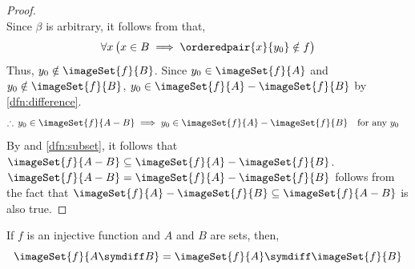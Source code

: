 \begin{proof}
\begin{equation*}
    \end{equation*}
    Since \( \beta \) is arbitrary, it follows from  that,
    \begin{equation*}
        \forall x \, \big( x \in B \implies \orderedpair{x}{y_{0}} \notin f \big)
    \end{equation*}
    Thus, \( y_{0} \notin \imageSet{f}{B} \). Since \( y_{0} \in \imageSet{f}{A} \) and \( y_{0} \notin \imageSet{f}{B} \),
    \( y_{0} \in \imageSet{f}{A} - \imageSet{f}{B} \) by \cref{dfn:difference}.
    \begin{equation*}
        \begin{aligned}
            \therefore \, y_{0} \in \imageSet{f}{A-B} \implies y_{0} \in \imageSet{f}{A} - \imageSet{f}{B}&
        \end{aligned}
        \begin{aligned}
            &\text{for any \( y_{0} \)}
        \end{aligned}
    \end{equation*}
    By  and \cref{dfn:subset}, it follows that \( \imageSet{f}{A-B} \subseteq \imageSet{f}{A} - \imageSet{f}{B} \).
    \( \imageSet{f}{A-B} = \imageSet{f}{A} - \imageSet{f}{B} \) follows from the fact that \( \imageSet{f}{A} - \imageSet{f}{B} \subseteq \imageSet{f}{A-B} \)
    is also true.
\end{proof}

\begin{thm}
    \label{thm:for-injective-functions-the-image-of-the-symdiff-is-the-symdiff-of-the-images}
    If \( f \) is an injective function and \( A \) and \( B \) are sets, then,
    \begin{equation*}
        \imageSet{f}{A \symdiff B} = \imageSet{f}{A} \symdiff \imageSet{f}{B}
    \end{equation*}
\end{thm}

